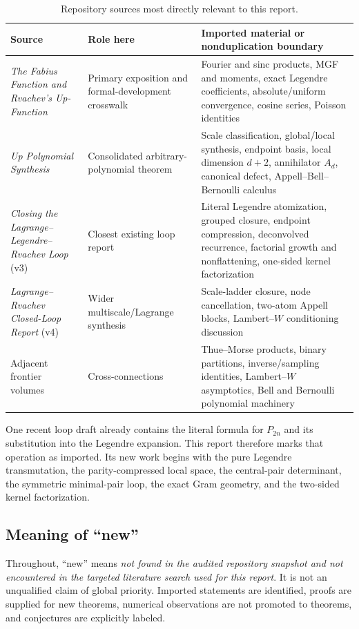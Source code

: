 \documentclass[11pt,oneside]{article}
\numberwithin{equation}{section}
\theoremstyle{definition}
\theoremstyle{remark}
\begin{document}
\begin{table}[htbp]
\centering
\caption{Repository sources most directly relevant to this report.}
\label{tab:corpus}
\begin{tabular}{p{}p{}p{}}
\toprule
Source & Role here & Imported material or nonduplication boundary\\
\midrule
\emph{The Fabius Function and Rvachev's Up-Function}
& Primary exposition and formal-development crosswalk
& Fourier and sinc products, MGF and moments, exact Legendre coefficients,
absolute/uniform convergence, cosine series, Poisson identities\\
\addlinespace
\emph{Up Polynomial Synthesis}
& Consolidated arbitrary-polynomial theorem
& Scale classification, global/local synthesis, endpoint basis, local
dimension $d+2$, annihilator $A_d$, canonical defect, Appell--Bell--Bernoulli
calculus\\
\addlinespace
\emph{Closing the Lagrange--Legendre--Rvachev Loop} (v3)
& Closest existing loop report
& Literal Legendre atomization, grouped closure, endpoint compression,
deconvolved recurrence, factorial growth and nonflattening, one-sided kernel
factorization\\
\addlinespace
\emph{Lagrange--Rvachev Closed-Loop Report} (v4)
& Wider multiscale/Lagrange synthesis
& Scale-ladder closure, node cancellation, two-atom Appell blocks, Lambert--$W$
conditioning discussion\\
\addlinespace
Adjacent frontier volumes
& Cross-connections
& Thue--Morse products, binary partitions, inverse/sampling identities,
Lambert--$W$ asymptotics, Bell and Bernoulli polynomial machinery\\
\bottomrule
\end{tabular}
\end{table}

One recent loop draft already contains the literal formula for $P_{2n}$ and
its substitution into the Legendre expansion.  This report therefore marks
that operation as imported.  Its new work begins with the pure Legendre
transmutation, the parity-compressed local space, the central-pair determinant,
the symmetric minimal-pair loop, the exact Gram geometry, and the two-sided
kernel factorization.

\subsection{Meaning of ``new''}

Throughout, ``new'' means \emph{not found in the audited repository snapshot
and not encountered in the targeted literature search used for this report}.
It is not an unqualified claim of global priority.  Imported statements are
identified, proofs are supplied for new theorems, numerical observations are
not promoted to theorems, and conjectures are explicitly labeled.
\end{document}
